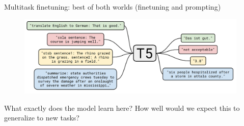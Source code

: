 %
%
%
%
%


\begin{frame}{Multitask finetuning: best of both worlds
(finetuning and  prompting)}

\vfill
	
	\begin{figure}
		\centering
		\includegraphics[width = 11cm]{figure/62-t5.png}\\ 
	\end{figure}

\pause

     \ques What exactly does the model learn here? How well
    would we expect this to generalize to new tasks?


\vfill

\end{frame}



